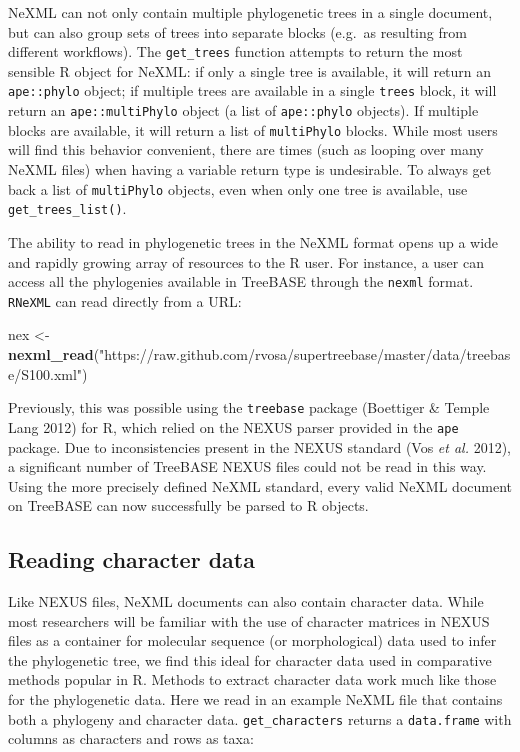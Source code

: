 \documentclass[author-year, review, 11pt]{components/elsarticle} %
\newenvironment{Shaded}{\begin{snugshade}}{\end{snugshade}}
\newcommand{\KeywordTok}[1]{\textcolor[rgb]{0.13,0.29,0.53}{\textbf{{#1}}}}
\newcommand{\StringTok}[1]{\textcolor[rgb]{0.31,0.60,0.02}{{#1}}}
\newcommand{\NormalTok}[1]{{#1}}
\begin{document}
NeXML can not only contain multiple phylogenetic trees in a single
document, but can also group sets of trees into separate blocks (e.g.~as
resulting from different workflows). The \texttt{get\_trees} function
attempts to return the most sensible R object for NeXML: if only a
single tree is available, it will return an \texttt{ape::phylo} object;
if multiple trees are available in a single \texttt{trees} block, it
will return an \texttt{ape::multiPhylo} object (a list of
\texttt{ape::phylo} objects). If multiple blocks are available, it will
return a list of \texttt{multiPhylo} blocks. While most users will find
this behavior convenient, there are times (such as looping over many
NeXML files) when having a variable return type is undesirable. To
always get back a list of \texttt{multiPhylo} objects, even when only
one tree is available, use \texttt{get\_trees\_list()}.

The ability to read in phylogenetic trees in the NeXML format opens up a
wide and rapidly growing array of resources to the R user. For instance,
a user can access all the phylogenies available in TreeBASE through the
\texttt{nexml} format. \texttt{RNeXML} can read directly from a URL:

\begin{Shaded}
\begin{Highlighting}[]
\NormalTok{nex <-}\StringTok{ }\KeywordTok{nexml_read}\NormalTok{(}\StringTok{"https://raw.github.com/rvosa/supertreebase/master/data/treebase/S100.xml"}\NormalTok{)}
\end{Highlighting}
\end{Shaded}

Previously, this was possible using the \texttt{treebase} package
(Boettiger \& {Temple Lang} 2012) for R, which relied on the NEXUS
parser provided in the \texttt{ape} package. Due to inconsistencies
present in the NEXUS standard (Vos \emph{et al.} 2012), a significant
number of TreeBASE NEXUS files could not be read in this way. Using the
more precisely defined NeXML standard, every valid NeXML document on
TreeBASE can now successfully be parsed to R objects.

\subsection{Reading character data}\label{reading-character-data}

Like NEXUS files, NeXML documents can also contain character data. While
most researchers will be familiar with the use of character matrices in
NEXUS files as a container for molecular sequence (or morphological)
data used to infer the phylogenetic tree, we find this ideal for
character data used in comparative methods popular in R. Methods to
extract character data work much like those for the phylogenetic data.
Here we read in an example NeXML file that contains both a phylogeny and
character data. \texttt{get\_characters} returns a \texttt{data.frame}
with columns as characters and rows as taxa:
\end{document}
